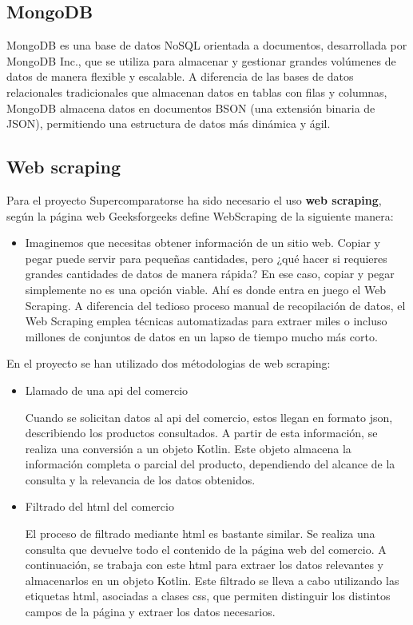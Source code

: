 \documentclass[12pt,twoside,titlepage]{report}
\newcommand{\titulotrabajo}{Supercomparator}
\begin{document}
\subsection{MongoDB}
\label{sec:MongoDB}

MongoDB \cite{mongodb} es una base de datos NoSQL orientada a documentos, desarrollada por MongoDB Inc., que se utiliza para almacenar y gestionar grandes volúmenes de datos de manera flexible y escalable. A diferencia de las bases de datos relacionales tradicionales que almacenan datos en tablas con filas y columnas, MongoDB almacena datos en documentos BSON (una extensión binaria de JSON), permitiendo una estructura de datos más dinámica y ágil.

\subsection{Web scraping}
\label{sec:WebScraping}

Para el proyecto \titulotrabajo \space se ha sido necesario el uso \textbf{web scraping}, según la página web Geeksforgeeks define WebScraping \cite{WebScraping} de la siguiente manera:

\begin{itemize}
	\item Imaginemos que necesitas obtener información de un sitio web. Copiar y pegar puede servir para pequeñas cantidades, pero ¿qué hacer si requieres grandes cantidades de datos de manera rápida? En ese caso, copiar y pegar simplemente no es una opción viable. Ahí es donde entra en juego el Web Scraping. A diferencia del tedioso proceso manual de recopilación de datos, el Web Scraping emplea técnicas automatizadas para extraer miles o incluso millones de conjuntos de datos en un lapso de tiempo mucho más corto.
\end{itemize}

En el proyecto se han utilizado dos métodologias de web scraping:

\begin{itemize}
	\item Llamado de una api del comercio

    Cuando se solicitan datos al api del comercio, estos llegan en formato json, describiendo los productos consultados. A partir de esta información, se realiza una conversión a un objeto Kotlin. Este objeto almacena la información completa o parcial del producto, dependiendo del alcance de la consulta y la relevancia de los datos obtenidos.
 
	\item Filtrado del html del comercio

    El proceso de filtrado mediante html es bastante similar. Se realiza una consulta que devuelve todo el contenido de la página web del comercio. A continuación, se trabaja con este html para extraer los datos relevantes y almacenarlos en un objeto Kotlin. Este filtrado se lleva a cabo utilizando las etiquetas html, asociadas a clases css, que permiten   distinguir los distintos campos de la página y extraer los datos necesarios.
\end{itemize}
\end{document}
